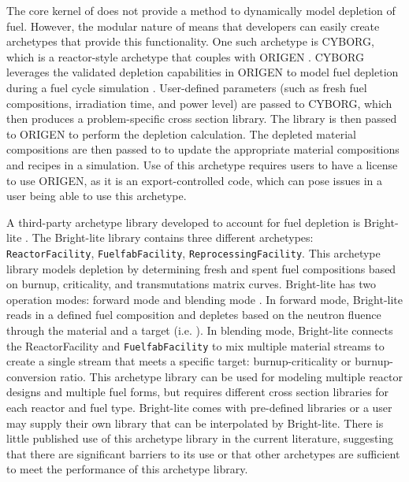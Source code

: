 The core kernel of \Cyclus does not provide a method to dynamically 
model depletion of fuel. However, the modular nature of \Cyclus means 
that developers can easily create archetypes that provide this 
functionality. One such archetype is \gls{CYBORG}, which is a 
reactor-style archetype that couples \Cyclus with ORIGEN 
\cite{skutnik_cyborg_2016}. \gls{CYBORG} leverages the validated 
depletion capabilities in ORIGEN to model fuel depletion during 
a fuel cycle simulation \cite{skutnik_cyborg_2016}. User-defined 
parameters (such as fresh fuel compositions, irradiation time, and 
power level) are passed to \gls{CYBORG}, which then produces a 
problem-specific cross section library. The library is then passed to 
ORIGEN to perform the depletion calculation. The depleted material 
compositions are then passed to \Cyclus to update the appropriate 
material compositions and recipes in a simulation. Use of this 
archetype requires users to have a license to use ORIGEN, as it 
is an export-controlled code, which can pose issues in a user being 
able to use this archetype. 

A third-party archetype library developed to account for fuel depletion 
is Bright-lite \cite{schneider_integrated_2016}. The Bright-lite 
library contains three different archetypes: \texttt{ReactorFacility}, 
\texttt{FuelfabFacility}, \texttt{ReprocessingFacility}. This archetype library 
models depletion by determining fresh and spent fuel compositions
based on burnup, criticality, and transmutations matrix curves. 
Bright-lite has two operation modes: forward mode and blending 
mode \cite{schneider_integrated_2016}. In forward mode, Bright-lite 
reads in a defined fuel composition and depletes based on the neutron 
fluence through the material and a target (i.e. ). In 
blending mode, Bright-lite connects the ReactorFacility and 
\texttt{FuelfabFacility} to mix multiple material streams to create a single 
stream that meets a specific target: burnup-criticality or burnup-conversion
ratio. This archetype library can be used for modeling multiple reactor 
designs and multiple fuel forms, but requires different cross 
section libraries for each reactor and fuel type. Bright-lite comes 
with pre-defined libraries or a user may supply their own 
library that can be interpolated by Bright-lite. There is little 
published use of this archetype library in the current literature, 
suggesting that there are significant barriers to its use or that 
other archetypes are sufficient to meet the performance of this 
archetype library. 

